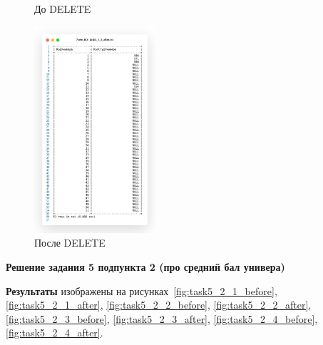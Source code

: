 \begin{figure}[!h]
\begin{minipage}{0.24\textwidth}
    \caption{До DELETE}
    \label{fig:task5_1_3_before}
  \end{minipage}
  \begin{minipage}{0.24\textwidth}
    \centering

    \includegraphics[width=4.5cm]
    {../sql/task5/task5_1_3_after.png}

    \caption{После DELETE}
    \label{fig:task5_1_3_after}
  \end{minipage}
\end{figure}

\begin{center}
  \textbf{Решение задания 5 подпункта 2 (про средний бал универа)}
\end{center}









\textbf{Результаты} изображены
на рисунках~\ref{fig:task5_2_1_before}, \ref{fig:task5_2_1_after},
\ref{fig:task5_2_2_before}, \ref{fig:task5_2_2_after},
\ref{fig:task5_2_3_before}, \ref{fig:task5_2_3_after},
\ref{fig:task5_2_4_before}, \ref{fig:task5_2_4_after}.

